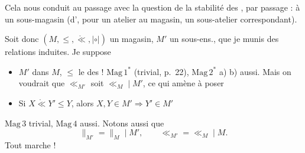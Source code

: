 \documentclass[11pt,a4paper]{article}
\begin{document}
Cela nous conduit au passage avec la question de la stabilité des
 , par passage : à un sous-magasin
(d', pour un atelier  au magasin, un
sous-atelier correspondant).

Soit donc $(M, \leq, \mathring{\ll}, \mathbin{|{\circ}|})$ un magasin, $M'$
un sous-ens., que je munis des relations induites. Je suppose
\begin{itemize}
  \item[a)] $M'$  dans $M$, $\leq$  le
   des  ! $\mathrm{Mag}\,1^*$ (trivial,
  p.~22), $\mathrm{Mag}\,2^*$ a) b) aussi. Mais on voudrait
  que $\ll_{M'}$ soit $\ll_M \mid M'$, ce qui amène à poser
  \item[b)] Si $X \mathring{\ll} Y' \leq Y$, alors $X, Y \in M' \Rightarrow Y' \in M'$
\end{itemize}
$\mathrm{Mag}\,3$ trivial, $\mathrm{Mag}\,4$ aussi. Notons aussi que
\[
\|_{M'} = \|_M \mid M' , \qquad \ll_{M'} = \ll_M \mid M .
\]
Tout marche !
\end{document}
